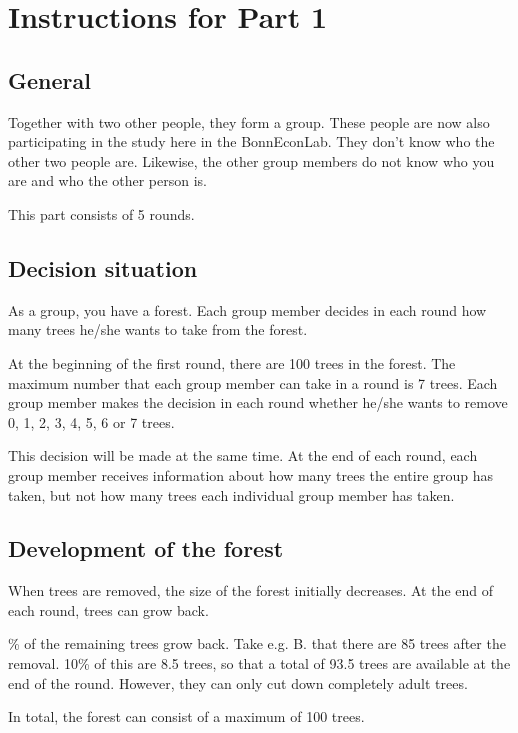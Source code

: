
\section*{Instructions for Part 1}
\subsection*{General}

\noindent Together with two other people, they form a group. These people are now also participating in the study here in the BonnEconLab. They don't know who the other two people are. Likewise, the other group members do not know who you are and who the other person is.

\noindent This part consists of 5 rounds.

\subsection*{Decision situation}

As a group, you have a forest. Each group member decides in each round how many trees he/she wants to take from the forest.

\noindent At the beginning of the first round, there are 100 trees in the forest. The maximum number that each group member can take in a round is 7 trees. Each group member makes the decision in each round whether he/she wants to remove 0, 1, 2, 3, 4, 5, 6 or 7 trees.

\noindent This decision will be made at the same time. At the end of each round, each group member receives information about how many trees the entire group has taken, but not how many trees each individual group member has taken.

\subsection*{Development of the forest}

\noindent When trees are removed, the size of the forest initially decreases. At the end of each round, trees can grow back.

\% of the remaining trees grow back. Take e.g. B. that there are 85 trees after the removal. 10\% of this are 8.5 trees, so that a total of 93.5 trees are available at the end of the round. However, they can only cut down completely adult trees.

\noindent In total, the forest can consist of a maximum of 100 trees.


